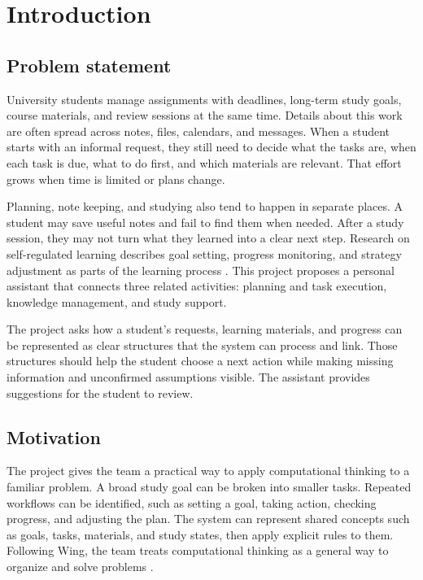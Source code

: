 \chapter{Introduction}

\section{Problem statement}

University students manage assignments with deadlines, long-term study goals, course materials, and review sessions at the same time. Details about this work are often spread across notes, files, calendars, and messages. When a student starts with an informal request, they still need to decide what the tasks are, when each task is due, what to do first, and which materials are relevant. That effort grows when time is limited or plans change.

Planning, note keeping, and studying also tend to happen in separate places. A student may save useful notes and fail to find them when needed. After a study session, they may not turn what they learned into a clear next step. Research on self-regulated learning describes goal setting, progress monitoring, and strategy adjustment as parts of the learning process \cite{zimmerman2002}. This project proposes a personal assistant that connects three related activities: planning and task execution, knowledge management, and study support.

The project asks how a student's requests, learning materials, and progress can be represented as clear structures that the system can process and link. Those structures should help the student choose a next action while making missing information and unconfirmed assumptions visible. The assistant provides suggestions for the student to review.

\section{Motivation}

The project gives the team a practical way to apply computational thinking to a familiar problem. A broad study goal can be broken into smaller tasks. Repeated workflows can be identified, such as setting a goal, taking action, checking progress, and adjusting the plan. The system can represent shared concepts such as goals, tasks, materials, and study states, then apply explicit rules to them. Following Wing, the team treats computational thinking as a general way to organize and solve problems \cite{wing2006}.

